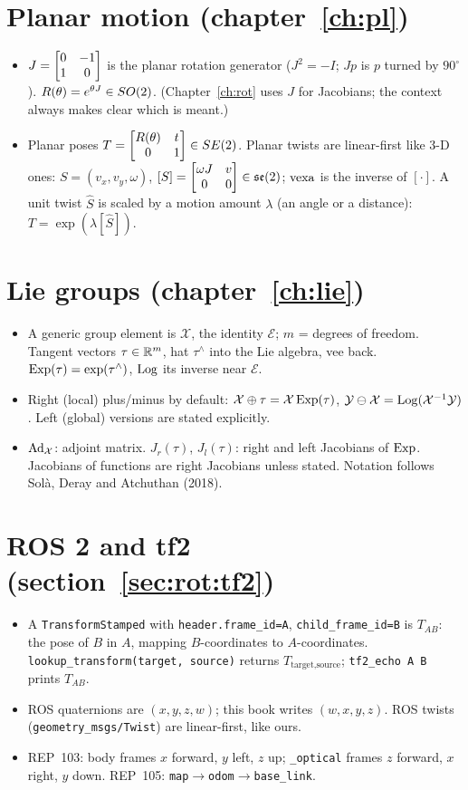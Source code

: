 \documentclass[../notes.tex]{subfiles}
\begin{document}
\section*{Planar motion (chapter~\ref{ch:pl})}
\begin{itemize}
\item $J=\begin{bmatrix}0&-1\\1&0\end{bmatrix}$ is the planar rotation generator ($J^2=-I$; $Jp$ is $p$ turned by $90^\circ$). $R(\theta)=e^{\theta J}\in SO(2)$. (Chapter~\ref{ch:rot} uses $J$ for Jacobians; the context always makes clear which is meant.)
\item Planar poses $T=\begin{bmatrix}R(\theta)&t\\0&1\end{bmatrix}\in SE(2)$. Planar twists are linear-first like 3-D ones: $S=(v_x,v_y,\omega)$, $[S]=\begin{bmatrix}\omega J&v\\0&0\end{bmatrix}\in\mathfrak{se}(2)$; $\operatorname{vexa}$ is the inverse of $[\cdot]$. A unit twist $\hat S$ is scaled by a motion amount $\lambda$ (an angle or a distance): $T=\exp(\lambda[\hat S])$.
\end{itemize}

\section*{Lie groups (chapter~\ref{ch:lie})}
\begin{itemize}
\item A generic group element is $\mathcal X$, the identity $\mathcal E$; $m$ = degrees of freedom. Tangent vectors $\tau\in\mathbb{R}^m$, hat $\tau^\wedge$ into the Lie algebra, vee back. $\operatorname{Exp}(\tau)=\exp(\tau^\wedge)$, $\operatorname{Log}$ its inverse near $\mathcal E$.
\item Right (local) plus/minus by default: $\mathcal X\oplus\tau=\mathcal X\operatorname{Exp}(\tau)$, $\mathcal Y\ominus\mathcal X=\operatorname{Log}(\mathcal X^{-1}\mathcal Y)$. Left (global) versions are stated explicitly.
\item $\operatorname{Ad}_{\mathcal X}$: adjoint matrix. $J_r(\tau)$, $J_l(\tau)$: right and left Jacobians of $\operatorname{Exp}$. Jacobians of functions are right Jacobians unless stated. Notation follows Solà, Deray and Atchuthan (2018).
\end{itemize}

\section*{ROS 2 and tf2 (section~\ref{sec:rot:tf2})}
\begin{itemize}
\item A \texttt{TransformStamped} with \texttt{header.frame\_id=A}, \texttt{child\_frame\_id=B} is $T_{AB}$: the pose of $B$ in $A$, mapping $B$-coordinates to $A$-coordinates. \texttt{lookup\_transform(target, source)} returns $T_{\text{target},\text{source}}$; \texttt{tf2\_echo A B} prints $T_{AB}$.
\item ROS quaternions are $(x,y,z,w)$; this book writes $(w,x,y,z)$. ROS twists (\texttt{geometry\_msgs/Twist}) are linear-first, like ours.
\item REP~103: body frames $x$ forward, $y$ left, $z$ up; \texttt{\_optical} frames $z$ forward, $x$ right, $y$ down. REP~105: \texttt{map}$\to$\texttt{odom}$\to$\texttt{base\_link}.
\end{itemize}
\end{document}
